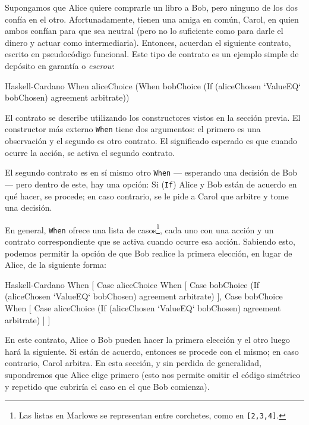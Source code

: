 \documentclass[12pt]{book}
\begin{document}
Supongamos que Alice quiere comprarle un libro a Bob, pero ninguno de los dos confía en el otro. Afortunadamente, tienen una amiga en común, Carol, en quien ambos confían para que sea neutral (pero no lo suficiente como para darle el dinero y actuar como intermediaria). Entonces, acuerdan el siguiente contrato, escrito en pseudocódigo funcional. Este tipo de contrato es un ejemplo simple de depósito en garantía o \textit{escrow}:

\begin{code}[title=Primer pseudocódigo del contrato Escrow.]{Haskell-Cardano}
When aliceChoice
     (When bobChoice
           (If (aliceChosen `ValueEQ` bobChosen)
               agreement
               arbitrate))
\end{code}


El contrato se describe utilizando los constructores vistos en la sección previa. El constructor más externo \texttt{When} tiene dos argumentos: el primero es una observación y el segundo es otro contrato. El significado esperado es que cuando ocurre la acción, se activa el segundo contrato.

El segundo contrato es en sí mismo otro \texttt{When} --- esperando una decisión de Bob --- pero dentro de este, hay una opción: Si (\texttt{If}) Alice y Bob están de acuerdo en qué hacer, se procede; en caso contrario, se le pide a Carol que arbitre y tome una decisión.

En general, \texttt{When} ofrece una lista de casos\footnote{Las listas en Marlowe se representan entre corchetes, como en \texttt{[2,3,4]}.}, cada uno con una acción y un contrato correspondiente que se activa cuando ocurre esa acción. Sabiendo esto, podemos permitir la opción de que Bob realice la primera elección, en lugar de Alice, de la siguiente forma:


\begin{code}[title=Pseudocódigo agnóstico al orden de las elecciones.]{Haskell-Cardano}
When [ Case aliceChoice
            When [ Case bobChoice
                        (If (aliceChosen `ValueEQ` bobChosen)
                           agreement
                           arbitrate) ],
      Case bobChoice
            When [ Case aliceChoice
                      (If (aliceChosen `ValueEQ` bobChosen)
                            agreement
                            arbitrate) ]
     ]
\end{code}

En este contrato, Alice o Bob pueden hacer la primera elección y el otro luego hará la siguiente. Si están de acuerdo, entonces se procede con el mismo; en caso contrario, Carol arbitra. En esta sección, y sin perdida de generalidad, supondremos que Alice elige primero (esto nos permite omitir el código simétrico y repetido que cubriría el caso en el que Bob comienza).
\end{document}
